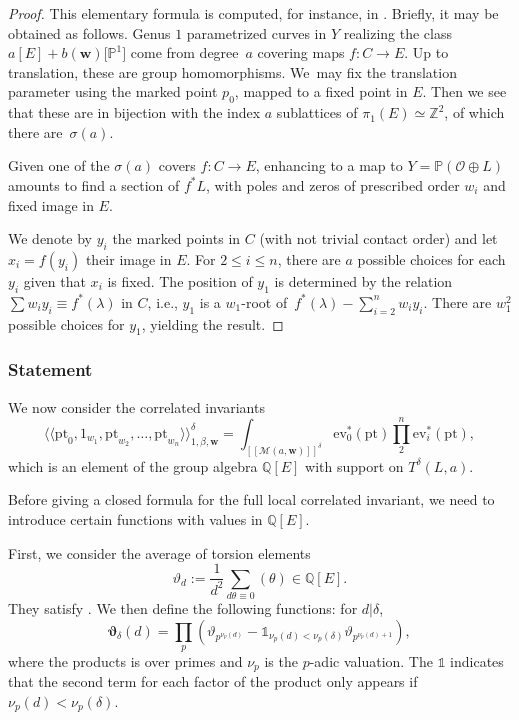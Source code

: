 \documentclass[11pt]{article}
\numberwithin{equation}{section}
\newcommand{\ev}{\mathrm{ev}}
\newcommand{\pt}{\mathrm{pt}}
\newcommand{\PP}{\mathbb{P}}
\newcommand{\ZZ}{\mathbb{Z}}
\newcommand{\QQ}{\mathbb{Q}}
\newcommand{\bfw}{ {\boldsymbol w} }
\newcommand{\M}{\mathcal{M}}
\renewcommand{\O}{\mathcal{O}}
\numberwithin{equation}{section}
\theoremstyle{definition}
\begin{document}
\begin{proof}
This elementary formula is computed, for instance, in \cite{blomme2022floor}. Briefly, it may be obtained as follows. Genus $1$ parametrized curves in $Y$ realizing the class $a[E]+b(\bfw)\big[\PP^1\big]$ come from degree~$a$ covering maps $f\colon C\to E$. Up to translation, these are group homomorphisms. We~may fix the translation parameter using the marked point $p_0$, mapped to a fixed point in $E$.
Then we see that these are in bijection with the index $a$ sublattices of $\pi_1(E)\simeq\ZZ^2$, of which there are~$\sigma(a)$.

 Given one of the $\sigma(a)$ covers $f\colon C\to E$, enhancing to a map to $Y=\PP(\O\oplus L)$ amounts to find a section of $f^*L$, with poles and zeros of prescribed order $w_i$ and fixed image in $E$.

We denote by $y_i$ the %
marked points in $C$ (with not trivial contact order) and let $x_i=f(y_i)$ their image in $E$. For $2\leqslant i\leqslant n$, there are $a$ possible choices for each $y_i$ given that $x_i$ is fixed. The position of $y_1$ is determined by the relation $\sum w_iy_i\equiv f^*(\lambda)$ in $C$, i.e., $y_1$ is a $w_1$-root of~${f^*(\lambda)-\sum_{i=2}^nw_iy_i}$.
There are $w_1^2$ possible choices for $y_1$, yielding the result.
\end{proof}

\subsubsection{Statement} We now consider the correlated invariants
\[ \langle\langle \pt_0,1_{w_1},\pt_{w_2},\dots,\pt_{w_n}\rangle\rangle^\delta_{1,\beta,\bfw}
= \int_{[\![\M(a,\bfw)]\!]^\delta}\ev_0^*(\pt)\prod_2^n\ev_i^*(\pt), \]
which is an element of the group algebra $\QQ[E]$ with support on $T^\delta(L,a)$.



Before giving a closed formula for the full local correlated invariant, we need to introduce certain functions with values in $\QQ[E]$.

First, we consider the average of torsion elements
\[\vartheta_d:=\frac{1}{d^2}\sum_{d\theta\equiv 0}(\theta) \in\QQ[E].\]
They satisfy .
We then define the following functions: for $d|\delta$,
\[
 \boldsymbol{\vartheta}_\delta(d) = \prod_p (\vartheta_{p^{\nu_p(d)}}-\mathds{1}_{\nu_p(d)<\nu_p(\delta)}\vartheta_{p^{\nu_p(d)+1}} ),
 \]
where the products is over primes and $\nu_p$ is the $p$-adic valuation. The $\mathds{1}$ indicates that the second term for each factor of the product only appears if $\nu_p(d)<\nu_p(\delta)$.
\end{document}

